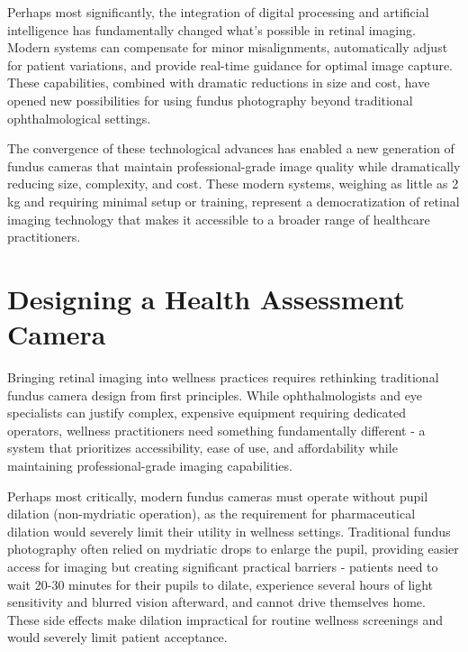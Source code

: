 \documentclass[
  Letterpaper,
]{scrbook}
\begin{document}
Perhaps most significantly, the integration of digital processing and
artificial intelligence has fundamentally changed what's possible in
retinal imaging. Modern systems can compensate for minor misalignments,
automatically adjust for patient variations, and provide real-time
guidance for optimal image capture. These capabilities, combined with
dramatic reductions in size and cost, have opened new possibilities for
using fundus photography beyond traditional ophthalmological settings.

The convergence of these technological advances has enabled a new
generation of fundus cameras that maintain professional-grade image
quality while dramatically reducing size, complexity, and cost. These
modern systems, weighing as little as 2 kg and requiring minimal setup
or training, represent a democratization of retinal imaging technology
that makes it accessible to a broader range of healthcare practitioners.

\section{Designing a Health Assessment
Camera}\label{designing-a-health-assessment-camera}

Bringing retinal imaging into wellness practices requires rethinking
traditional fundus camera design from first principles. While
ophthalmologists and eye specialists can justify complex, expensive
equipment requiring dedicated operators, wellness practitioners need
something fundamentally different - a system that prioritizes
accessibility, ease of use, and affordability while maintaining
professional-grade imaging capabilities.

Perhaps most critically, modern fundus cameras must operate without
pupil dilation (non-mydriatic operation), as the requirement for
pharmaceutical dilation would severely limit their utility in wellness
settings. Traditional fundus photography often relied on mydriatic drops
to enlarge the pupil, providing easier access for imaging but creating
significant practical barriers - patients need to wait 20-30 minutes for
their pupils to dilate, experience several hours of light sensitivity
and blurred vision afterward, and cannot drive themselves home. These
side effects make dilation impractical for routine wellness screenings
and would severely limit patient acceptance.
\end{document}
